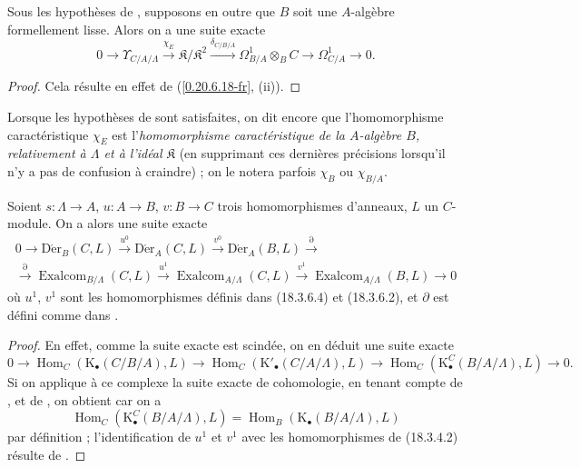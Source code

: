 \begin{corollary}[20.6.23]
\label{0.20.6.23-fr}
Sous les hypothèses de \textup{}, supposons en outre que $B$ soit
une $A$-algèbre formellement lisse. Alors on a une suite exacte
\begin{equation}
\tag{20.6.23.1}
\label{0.20.6.23.1-fr}
  0\to\Upsilon_{C/A/\Lambda}\xrightarrow{\chi_E}
  \mathfrak{K}/\mathfrak{K}^2\xrightarrow{\delta_{C/B/A}}
  \Omega^1_{B/A}\otimes_B C\to\Omega^1_{C/A}\to0.
\end{equation}
\end{corollary}

\begin{proof}
Cela résulte en effet de (\ref{0.20.6.18-fr}, (ii)).
\end{proof}

\begin{env}[20.6.24]
\label{0.20.6.24-fr}
Lorsque les hypothèses de  sont satisfaites, on dit encore
que l'homomorphisme caractéristique $\chi_E$ est
l'\emph{homomorphisme caractéristique de la $A$-algèbre $B$, relativement à
$\Lambda$ et à l'idéal $\mathfrak{K}$} (en supprimant ces dernières
précisions lorsqu'il n'y a pas de confusion à craindre) ; on le notera
parfois $\chi_B$ ou $\chi_{B/A}$.
\end{env}

\begin{proposition}[20.6.25]
\label{0.20.6.25-fr}
Soient $s:\Lambda\to A$, $u:A\to B$, $v:B\to C$ trois homomorphismes
d'anneaux, $L$ un $C$-module. On a alors une suite exacte
\begin{equation}
\tag{20.6.25.1}
\label{0.20.6.25.1-fr}
\begin{split}
  0\to\operatorname{D\acute{e}r}_B(C,L)\xrightarrow{u^0}
  \operatorname{D\acute{e}r}_A(C,L)\xrightarrow{v^0}
  \operatorname{D\acute{e}r}_A(B,L)\xrightarrow{\partial} \\
  \xrightarrow{\partial}\operatorname{Exalcom}_{B/\Lambda}(C,L)\xrightarrow{u^1}
  \operatorname{Exalcom}_{A/\Lambda}(C,L)\xrightarrow{v^1}
  \operatorname{Exalcom}_{A/\Lambda}(B,L)\to0
\end{split}
\end{equation}
où $u^1$, $v^1$ sont les homomorphismes définis dans \textup{(18.3.6.4)} et
\textup{(18.3.6.2)}, et $\partial$ est défini comme dans \textup{}.
\end{proposition}

\begin{proof}
En effet, comme la suite exacte  est scindée, on en
déduit une suite exacte
\[
  0\to\operatorname{Hom}_C(\mathrm{K}_\bullet(C/B/A),L)\to
  \operatorname{Hom}_C(\mathrm{K}'_\bullet(C/A/\Lambda),L)\to
  \operatorname{Hom}_C(\mathrm{K}^C_\bullet(B/A/\Lambda),L)\to0.
\]
Si on applique à ce complexe la suite exacte de cohomologie, en tenant compte
de , et de , on obtient
 car on a
\[
  \operatorname{Hom}_C(\mathrm{K}^C_\bullet(B/A/\Lambda),L)
  =\operatorname{Hom}_B(\mathrm{K}_\bullet(B/A/\Lambda),L)
\]
par définition ; l'identification de $u^1$ et $v^1$ avec les homomorphismes
de (18.3.4.2) résulte de .
\end{proof}

